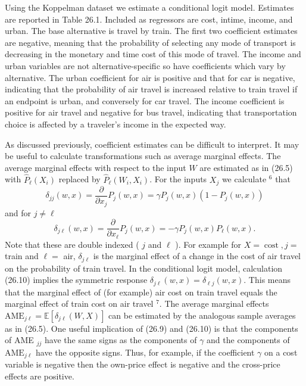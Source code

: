 \documentclass[10pt]{article}
\begin{document}
Using the Koppelman dataset we estimate a conditional logit model. Estimates are reported in Table 26.1. Included as regressors are cost, intime, income, and urban. The base alternative is travel by train. The first two coefficient estimates are negative, meaning that the probability of selecting any mode of transport is decreasing in the monetary and time cost of this mode of travel. The income and urban variables are not alternative-specific so have coefficients which vary by alternative. The urban coefficient for air is positive and that for car is negative, indicating that the probability of air travel is increased relative to train travel if an endpoint is urban, and conversely for car travel. The income coefficient is positive for air travel and negative for bus travel, indicating that transportation choice is affected by a traveler's income in the expected way.

As discussed previously, coefficient estimates can be difficult to interpret. It may be useful to calculate transformations such as average marginal effects. The average marginal effects with respect to the input $W$ are estimated as in (26.5) with $\widehat{P}_{\ell}\left(X_{i}\right)$ replaced by $\widehat{P}_{\ell}\left(W_{i}, X_{i}\right)$. For the inputs $X_{j}$ we calculate ${ }^{6}$ that
$$
\delta_{j j}(w, x)=\frac{\partial}{\partial x_{j}} P_{j}(w, x)=\gamma P_{j}(w, x)\left(1-P_{j}(w, x)\right)
$$
and for $j \neq \ell$
$$
\delta_{j \ell}(w, x)=\frac{\partial}{\partial x_{\ell}} P_{j}(w, x)=-\gamma P_{j}(w, x) P_{\ell}(w, x) .
$$
Note that these are double indexed ( $j$ and $\ell$ ). For example for $X=\operatorname{cost}, j=$ train and $\ell=$ air, $\delta_{j \ell}$ is the marginal effect of a change in the cost of air travel on the probability of train travel. In the conditional logit model, calculation (26.10) implies the symmetric response $\delta_{j \ell}(w, x)=\delta_{\ell j}(w, x)$. This means that the marginal effect of (for example) air cost on train travel equals the marginal effect of train cost on air travel $^{7}$. The average marginal effects $\mathrm{AME}_{j \ell}=\mathbb{E}\left[\delta_{j \ell}(W, X)\right]$ can be estimated by the analogous sample averages as in (26.5). One useful implication of (26.9) and (26.10) is that the components of AME ${ }_{j j}$ have the same signs as the components of $\gamma$ and the components of $\mathrm{AME}_{j \ell}$ have the opposite signs. Thus, for example, if the coefficient $\gamma$ on a cost variable is negative then the own-price effect is negative and the cross-price effects are positive.
\end{document}
